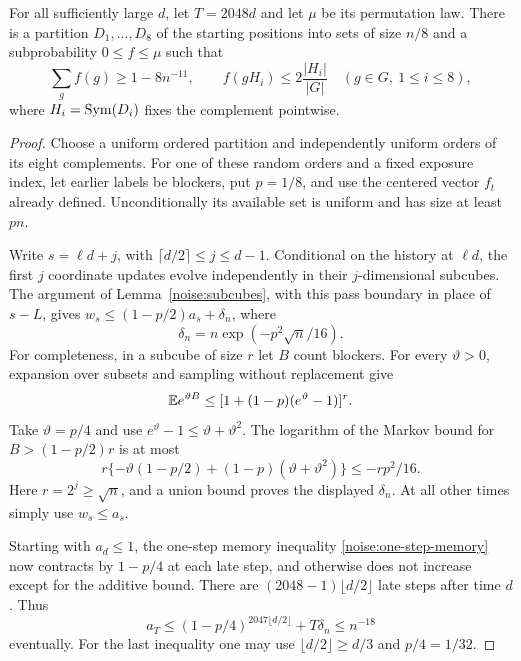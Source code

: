 \begin{proposition}
\label{noise:predictable-cosets}
For all sufficiently large $d$, let $T=2048d$ and let $\mu$ be its
permutation law. There is a
partition $D_1,\ldots,D_8$ of the starting positions into sets of size
$n/8$ and a subprobability $0\le f\le\mu$ such that
\begin{equation}
 \sum_g f(g)\ge1-8n^{-11},\qquad
 f(gH_i)\le2\frac{|H_i|}{|G|}
 \quad(g\in G,\ 1\le i\le8),
 \label{noise:predictable-cap}
\end{equation}
where $H_i=\operatorname{Sym}(D_i)$ fixes the complement pointwise.
\end{proposition}

\begin{proof}
Choose a uniform ordered partition and independently uniform orders
of its eight complements. For one of these random orders and a fixed exposure index, let
earlier labels be blockers, put $p=1/8$, and use the centered vector
$f_t$ already defined. Unconditionally its available set is uniform and
has size at least $pn$.

Write $s=\ell d+j$, with $\lceil d/2\rceil\le j\le d-1$.
Conditional on the history at $\ell d$, the first $j$ coordinate
updates evolve independently in their $j$-dimensional subcubes.
The argument of Lemma~\ref{noise:subcubes}, with this pass boundary
in place of $s-L$, gives $w_s\le(1-p/2)a_s+\delta_n$, where
\[
 \delta_n=n\exp(-p^2\sqrt n/16).
\]
For completeness, in a subcube of size $r$ let $B$ count blockers.
For every $\vartheta>0$, expansion over subsets and sampling without
replacement give
\[
 \mathbb E e^{\vartheta B}
 \le[1+(1-p)(e^{\vartheta}-1)]^r.
\]
Take $\vartheta=p/4$ and use
$e^\vartheta-1\le\vartheta+\vartheta^2$. The logarithm of the
Markov bound for $B>(1-p/2)r$ is at most
\[
 r\{-\vartheta(1-p/2)+(1-p)(\vartheta+\vartheta^2)\}
 \le-rp^2/16.
\]
Here $r=2^j\ge\sqrt n$, and a union bound proves the displayed
$\delta_n$. At all other times simply use $w_s\le a_s$.

Starting with $a_d\le1$, the one-step memory inequality
\eqref{noise:one-step-memory} now contracts by $1-p/4$ at each
late step, and otherwise does not increase except for the additive
bound. There are $(2048-1)\lfloor d/2\rfloor$ late steps after
time $d$. Thus
\begin{equation}
 a_T\le(1-p/4)^{2047\lfloor d/2\rfloor}+T\delta_n
 \le n^{-18}
 \label{noise:predictable-energy}
\end{equation}
eventually. For the last inequality one may use
$\lfloor d/2\rfloor\ge d/3$ and $p/4=1/32$.


\end{proof}
